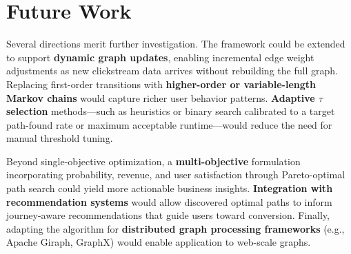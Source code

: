 \section{Future Work}

Several directions merit further investigation. The framework could be extended to support \textbf{dynamic graph updates}, enabling incremental edge weight adjustments as new clickstream data arrives without rebuilding the full graph. Replacing first-order transitions with \textbf{higher-order or variable-length Markov chains} would capture richer user behavior patterns. \textbf{Adaptive $\tau$ selection} methods---such as heuristics or binary search calibrated to a target path-found rate or maximum acceptable runtime---would reduce the need for manual threshold tuning.

Beyond single-objective optimization, a \textbf{multi-objective} formulation incorporating probability, revenue, and user satisfaction through Pareto-optimal path search could yield more actionable business insights. \textbf{Integration with recommendation systems} would allow discovered optimal paths to inform journey-aware recommendations that guide users toward conversion. Finally, adapting the algorithm for \textbf{distributed graph processing frameworks} (e.g., Apache Giraph, GraphX) would enable application to web-scale graphs.
